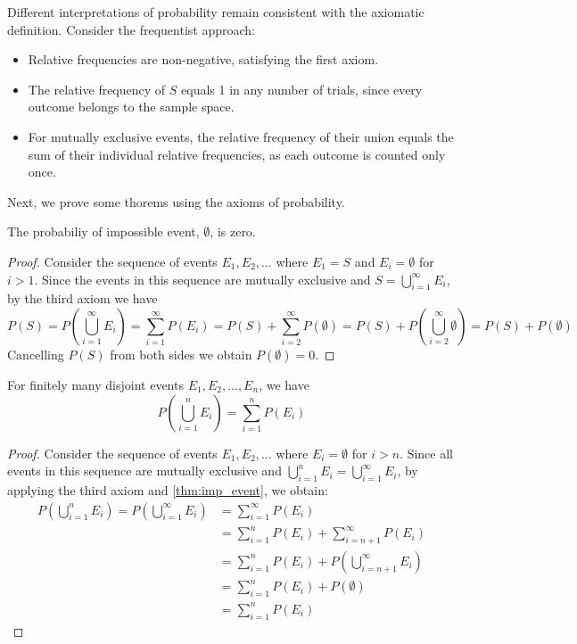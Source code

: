 Different interpretations of probability remain consistent with the axiomatic definition.
Consider the frequentist approach:
\begin{itemize}
	\item Relative frequencies are non-negative, satisfying the first axiom.
	\item The relative frequency of \( S \) equals 1 in any number of trials, since every outcome belongs to the sample space.
	\item For mutually exclusive events, the relative frequency of their union equals the sum of their individual relative frequencies, as each outcome is counted only once.
\end{itemize}
Next, we prove some thorems using the axioms of probability.

\begin{theorem}\label{thm:imp_event}
	The probabiliy of impossible event, \( \emptyset \), is zero.
\end{theorem}
\begin{proof}
	Consider the sequence of events \( E_1, E_2, \ldots \) where \( E_1 = S \) and \( E_i = \emptyset \) for \( i > 1 \).
	Since the events in this sequence are mutually exclusive and \( S = \bigcup_{i = 1}^{\infty} E_i \), by the third axiom we have
	\[
	P(S) = P(\bigcup_{i = 1}^{\infty} E_i) = \sum_{i = 1}^{\infty} P(E_i) = P(S) + \sum_{i = 2}^{\infty} P(\emptyset) = P(S) + P(\bigcup_{i = 2}^{\infty}\emptyset) = P(S) + P(\emptyset)
	\]
	Cancelling \( P(S) \) from both sides we obtain \( P(\emptyset) = 0 \).
\end{proof}

\begin{theorem}\label{thm:finite_probs}
	For finitely many disjoint events \( E_1, E_2, \ldots, E_n \), we have
	\[
	P(\bigcup_{i = 1}^{n} E_i) = \sum_{i = 1}^{n} P(E_i)
	\]
\end{theorem}
\begin{proof}
	Consider the sequence of events \( E_1, E_2, \ldots \) where \( E_i = \emptyset \) for \( i > n \).
	Since all events in this sequence are mutually exclusive and \( \bigcup_{i = 1}^{n} E_i = \bigcup_{i = 1}^{\infty} E_i \),
	by applying the third axiom and \autoref{thm:imp_event}, we obtain:
	\begin{align*}
	P(\bigcup_{i = 1}^{n} E_i) = P(\bigcup_{i = 1}^{\infty} E_i) &= \sum_{i = 1}^{\infty} P(E_i)\\
	&= \sum_{i = 1}^{n} P(E_i) + \sum_{i = n + 1}^{\infty} P(E_i)\\
	&= \sum_{i = 1}^{n} P(E_i) + P(\bigcup_{i = n + 1}^{\infty} E_i)\\
	&= \sum_{i = 1}^{n} P(E_i) + P(\emptyset)\\
	&= \sum_{i = 1}^{n} P(E_i)
	\end{align*}
\end{proof}

